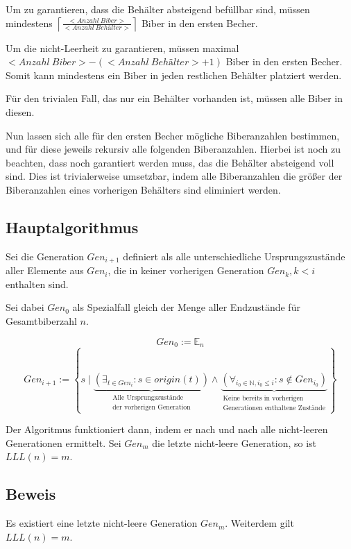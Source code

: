 \documentclass[a4paper,10pt,ngerman]{scrartcl}
\begin{document}
Um zu garantieren, dass die Behälter absteigend befüllbar sind, müssen mindestens \(\left\lceil\frac{<Anzahl\ Biber>}{<Anzahl\ Behälter>}\right\rceil\) Biber in den ersten Becher.

Um die nicht-Leerheit zu garantieren, müssen maximal \(<Anzahl\ Biber> - (<Anzahl\ Behälter> + 1)\) Biber in den ersten Becher. Somit kann mindestens ein Biber in jeden restlichen Behälter platziert werden.

Für den trivialen Fall, das nur ein Behälter vorhanden ist, müssen alle Biber in diesen.

Nun lassen sich alle für den ersten Becher mögliche Biberanzahlen bestimmen, und für diese jeweils rekursiv alle folgenden Biberanzahlen. Hierbei ist noch zu beachten, dass noch garantiert werden muss, das die Behälter absteigend voll sind. Dies ist trivialerweise umsetzbar, indem alle Biberanzahlen die größer der Biberanzahlen eines vorherigen Behälters sind eliminiert werden.

\subsection{Hauptalgorithmus}

Sei die Generation \(Gen_{i+1}\) definiert als alle unterschiedliche Ursprungszustände aller Elemente aus \(Gen_i\), die in keiner vorherigen Generation \(Gen_k, k < i\) enthalten sind.

Sei dabei \(Gen_0\) als Spezialfall gleich der Menge aller Endzustände für Gesamtbiberzahl \(n\).

\[Gen_0 := \mathbb{E}_n\]
\[Gen_{i+1} := \left\{ s \mid \underbrace{\left(\exists_{t \in Gen_i} : s \in origin(t)\right)}_{\substack{\text{Alle Ursprungszustände}\\\text{der vorherigen Generation}}} \land \underbrace{\left(\forall_{i_0\in\mathbb{N}, i_0 \leq i}: s \notin Gen_{i_0}\right)}_{\substack{\text{Keine bereits in vorherigen}\\\text{Generationen enthaltene Zustände}}} \right\}\]

Der Algoritmus funktioniert dann, indem er nach und nach alle nicht-leeren Generationen ermittelt. Sei \(Gen_m\) die letzte nicht-leere Generation, so ist \(LLL(n) = m\).

\subsection{Beweis}

Es existiert eine letzte nicht-leere Generation \(Gen_m\).
Weiterdem gilt \(LLL(n) = m\).
\end{document}
